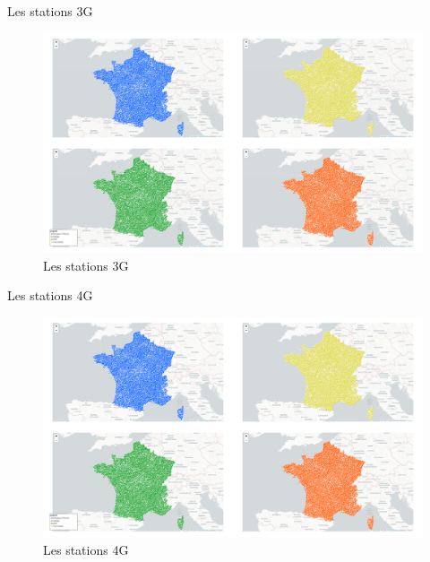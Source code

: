 \begin{frame}{Les stations 3G}
    \begin{figure}
        \includegraphics[width=0.9\paperheight]{images/cartes/providers-site_3g.png}
        \caption{\label{fig:sp-3g}Les stations 3G}
    \end{figure}
\end{frame}

\begin{frame}{Les stations 4G}
    \begin{figure}
        \includegraphics[width=0.9\paperheight]{images/cartes/providers-site_4g.png}
        \caption{\label{fig:sp-4g}Les stations 4G}
    \end{figure}
\end{frame}

